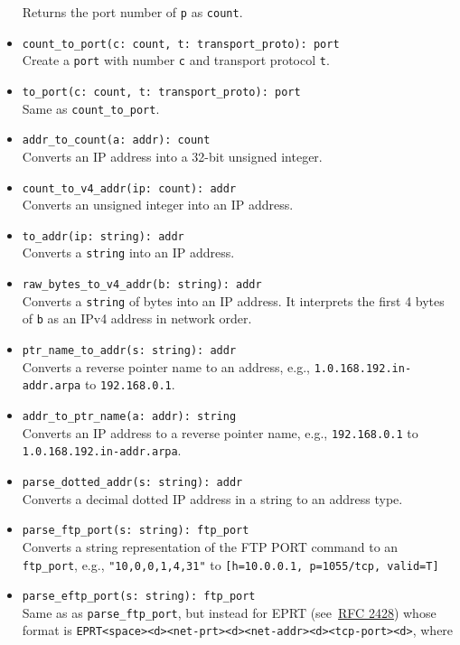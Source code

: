 \documentclass[10pt,landscape]{article}
\begin{document}
\begin{multicols*}{2}
\begin{itemize}
    Returns the port number of \texttt{p} as \texttt{count}.
  \item \verb|count_to_port(c: count, t: transport_proto): port|\\
    Create a \texttt{port} with number \texttt{c} and transport protocol
    \texttt{t}.
  \item \verb|to_port(c: count, t: transport_proto): port|\\
    Same as \verb|count_to_port|.
  \item \verb|addr_to_count(a: addr): count|\\
    Converts an IP address into a 32-bit unsigned integer.
  \item \verb|count_to_v4_addr(ip: count): addr|\\
    Converts an unsigned integer into an IP address.
  \item \verb|to_addr(ip: string): addr|\\
    Converts a \texttt{string} into an IP address.
  \item \verb|raw_bytes_to_v4_addr(b: string): addr|\\
    Converts a \texttt{string} of bytes into an IP address. It interprets the
    first 4 bytes of \texttt{b} as an IPv4 address in network order.
  \item \verb|ptr_name_to_addr(s: string): addr|\\
    Converts a reverse pointer name to an address, e.g.,
    \verb|1.0.168.192.in-addr.arpa| to \verb|192.168.0.1|.
  \item \verb|addr_to_ptr_name(a: addr): string|\\
    Converts an IP address to a reverse pointer name, e.g.,
    \verb|192.168.0.1| to \verb|1.0.168.192.in-addr.arpa|.
  \item \verb|parse_dotted_addr(s: string): addr|\\
    Converts a decimal dotted IP address in a string to an address type.
  \item \verb|parse_ftp_port(s: string): ftp_port|\\
    Converts a string representation of the FTP PORT command to an
    \verb|ftp_port|,
    e.g., \verb|"10,0,0,1,4,31"| to \verb|[h=10.0.0.1, p=1055/tcp, valid=T]|
  \item \verb|parse_eftp_port(s: string): ftp_port|\\
    Same as as \verb|parse_ftp_port|, but instead for EPRT
    (see~\href{http://tools.ietf.org/html/rfc2428}{RFC 2428}) whose format is
    \verb|EPRT<space><d><net-prt><d><net-addr><d><tcp-port><d>|, where

\end{itemize}
\end{multicols*}
\end{document}
